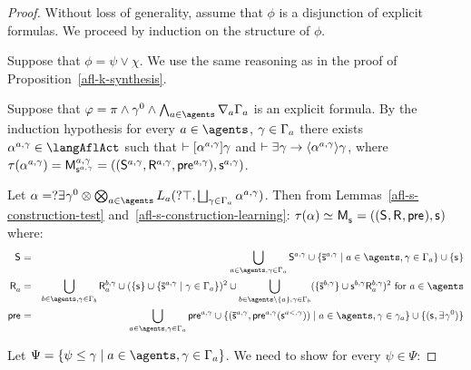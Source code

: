 \begin{proof}
Without loss of generality, assume that $\phi$ is a disjunction of explicit formulas.
We proceed by induction on the structure of $\phi$.

Suppose that $\phi = \psi \lor \chi$. We use the same reasoning as in the proof of Proposition~\ref{afl-k-synthesis}.

Suppose that $\phi = \pi \land \gamma^0 \land \bigwedge_{\agentA \in \agents} \coversA \Gamma_\agentA$ is an explicit formula.
By the induction hypothesis for every $\agentA \in \agents$, $\gamma \in \Gamma_a$ there exists $\alpha^{\agentA,\gamma} \in \langAflAct$ such that $\vdash {[ {\alpha^{a,\gamma}} ]} \gamma$ and $\proves \somerefs \gamma \implies \actionE{\alpha^{\agentA,\gamma}} \gamma$, where $\tau(\alpha^{\agentA,\gamma}) = \aPModel[\agentA,\gamma]{\aStateS[\agentA,\gamma]} = \aPModelTuple[\agentA,\gamma]{\aStateS[\agentA,\gamma]}$.

Let $\alpha = \test{\somerefs \gamma^0} \compose \bigcompose_{\agentA \in \agents} \learnsA (\test{\top}, \bigchoice_{\gamma \in \Gamma_\agentA} \alpha^{\agentA,\gamma})$.
Then from Lemmas~\ref{afl-s-construction-test} and~\ref{afl-s-construction-learning}: $\tau(\alpha) \bisimilar \aPModel{\aStateS} = \aPModelTuple{\aStateS}$ where:
\begin{eqnarray*}
    \aStates &=& \bigcup_{\agentA \in \agents, \gamma \in \Gamma_\agentA} \aStates[\agentA,\gamma] \cup \{\aPStateS[\agentA,\gamma] \mid \agentA \in \agents, \gamma \in \Gamma_\agentA\} \cup \{\aStateS\}\\
    \aAccessibility{\agentA} &=& \bigcup_{\agentB \in \agents, \gamma \in \Gamma_\agentB} \aAccessibility[\agentB,\gamma]{\agentA} \cup (\{\aStateS\} \cup \{\aPStateS[\agentA,\gamma] \mid \gamma \in \Gamma_\agentA\})^2 \cup \bigcup_{\agentB \in \agents \setminus \{\agentA\}, \gamma \in \Gamma_\agentB} (\{\aPStateS[\agentB,\gamma]\} \cup \aStateS[\agentB,\gamma] \aAccessibility[\agentB,\gamma]{\agentA})^2 \text{ for } \agentA \in \agents\\
    \aPrecondition &=& \bigcup_{\agentA \in \agents, \gamma \in \Gamma_\agentA} \aPrecondition[\agentA,\gamma] \cup \{(\aPStateS[\agentA,\gamma], \aPrecondition[\agentA,\gamma](\aStateS[\agentA<,\gamma])) \mid \agentA \in \agents, \gamma \in \gamma_\agentA\} \cup \{(\aStateS, \somerefs \gamma^0)\}
\end{eqnarray*}

Let $\Psi = \{\psi \leq \gamma \mid \agentA \in \agents, \gamma \in \Gamma_\agentA\}$. We need to show for every $\psi \in \Psi$:


\end{proof}
